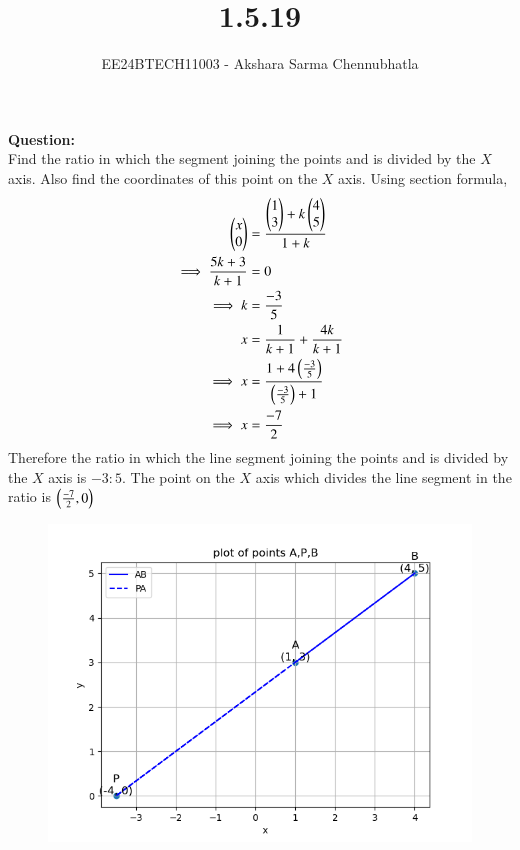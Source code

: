 \documentclass[journal,12pt,onecolumn]{IEEEtran}
\theoremstyle{remark}
\begin{document}

\vspace{3cm}

\title{1.5.19}
\author{EE24BTECH11003 - Akshara Sarma Chennubhatla}
\maketitle
\bigskip

\renewcommand{\thefigure}{\theenumi}
\renewcommand{\thetable}{\theenumi}

\textbf{Question:} \\Find the ratio in which the segment joining the points  and  is divided by the $X$ axis. Also find the coordinates of this point on the $X$ axis.
Using section formula,\\
\solution
\begin{align}
\begin{pmatrix}x\\0\end{pmatrix}&=\frac{\begin{pmatrix}1\\3\end{pmatrix}+k\begin{pmatrix}4\\5\end{pmatrix}}{1+k}\\
\implies \frac{5k+3}{k+1}&=0\\
\implies k&=\frac{-3}{5}\\
x&=\frac{1}{k+1}+\frac{4k}{k+1}\\
\implies x&=\frac{1+4\left(\frac{-3}{5}\right)}{\left(\frac{-3}{5}\right)+1}\\
\implies x&=\frac{-7}{2}
\end{align}
Therefore the ratio in which the line segment joining the points  and  is divided by the $X$ axis is $-3:5$. The point on the $X$ axis which divides the line segment in the ratio is $\left(\frac{-7}{2},0\right)$
\begin{figure}[h!]
\centering
\includegraphics[width=0.7\linewidth]{figs/figure.png}	
\label{stemplot}
\end{figure}
\end{document}
